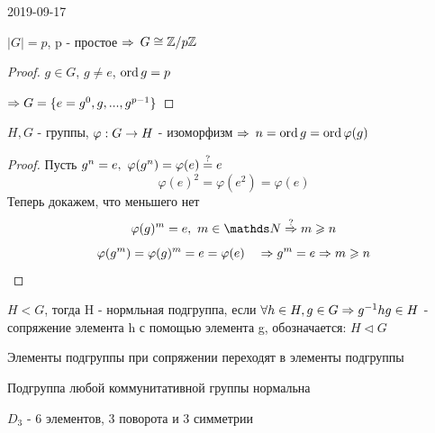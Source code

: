 \documentclass[main]{subfiles}
\begin{document}
	\begin{lect} {2019-09-17}
		\begin{utv}
		    $|G|=p$, p - простое $\Rightarrow$ $G \cong \mathbb{Z} /p \mathbb{Z}$
		\end{utv}

		\begin{proof}
		    $g \in G$, $g \neq e$, $\mathop{\rm ord}\nolimits g=p$

		    $\Rightarrow G=\{e=g^0,g,...,g^{p-1}\}$
		\end{proof}

		\begin{utv}
		    $H,G$ - группы, $\varphi: G \rightarrow H$ - изоморфизм $\Rightarrow$ $n=\mathop{\rm ord}\nolimits g=\mathop{\rm ord}\nolimits \varphi(g)$
		\end{utv}

		\begin{proof}
		    Пусть $g^n=e,\ \varphi(g^n)=\varphi(e)\os{?}{=}e$
		    \[\varphi(e)^2=\varphi(e^2)=\varphi(e)\]
		    Теперь докажем, что меньшего нет
		    \[\varphi(g)^m = e,\ m \in \N \os{?}{\Ra} m \geqslant n\]
			\[\varphi(g^m) = \varphi(g)^m = e = \varphi(e) \quad \Rightarrow g^m = e \Rightarrow m \geqslant n\]
		\end{proof}

		\begin{definition}
		    $H<G$, тогда H - нормльная подгруппа, если $\forall h \in H, g \in G \Rightarrow g^{-1}h g \in H$ - сопряжение элемента h с помощью элемента g, обозначается: $H \triangleleft G$
		\end{definition}

		\begin{remark}
		    Элементы подгруппы при сопряжении переходят в элементы подгруппы
		\end{remark}

		\begin{remark}
		    Подгруппа любой коммунитативной группы нормальна
		\end{remark}

		\begin{example}
		    $D_3$ - 6 элементов, 3 поворота и 3 симметрии


\end{example}
\end{lect}
\end{document}
